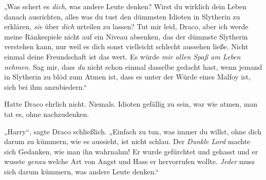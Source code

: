 „Was schert es \emph{dich}, was andere Leute denken? Wirst du wirklich dein Leben danach ausrichten, alles was du tust den dümmsten Idioten in Slytherin zu erklären, \emph{sie} über \emph{dich} urteilen zu lassen? Tut mir leid, Draco, aber ich werde meine Ränkespiele nicht auf ein Niveau absenken, das der dümmste Slytherin verstehen kann, nur weil es dich sonst vielleicht schlecht aussehen ließe. Nicht einmal deine Freundschaft ist das wert. Es würde \emph{mir allen Spaß am Leben nehmen.} Sag mir, dass \emph{du} nicht schon einmal dasselbe gedacht hast, wenn jemand in Slytherin zu blöd zum Atmen ist, dass es unter der Würde eines Malfoy ist, sich bei ihm anzubiedern.“

Hatte Draco ehrlich nicht. Niemals. Idioten gefällig zu sein, war wie atmen, man tat es, ohne nachzudenken.

„Harry“, sagte Draco schließlich.
„Einfach zu tun, was immer du willst, ohne dich darum zu kümmern, wie es aussieht, ist nicht schlau. Der \emph{Dunkle Lord} machte sich Gedanken, wie man ihn wahrnahm! Er wurde gefürchtet und gehasst und er wusste \emph{genau} welche Art von Angst und Hass er hervorrufen wollte. \emph{Jeder} muss sich darum kümmern, was andere Leute denken.“

